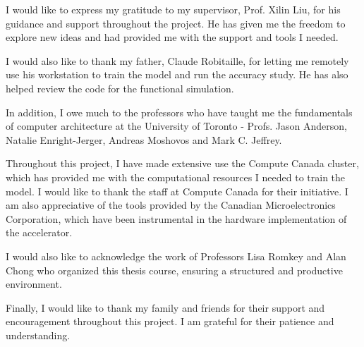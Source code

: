 I would like to express my gratitude to my supervisor, Prof. Xilin Liu, for his guidance and support throughout the project. He has given me the freedom to explore new ideas and had provided me with the
support and tools I needed.

I would also like to thank my father, Claude Robitaille, for letting me remotely use his workstation to train the model and run the accuracy study. He has also helped review the code for the functional simulation.

In addition, I owe much to the professors who have taught me the fundamentals of computer architecture at the University of Toronto - Profs. Jason Anderson, Natalie Enright-Jerger, Andreas Moshovos and Mark C. Jeffrey.

Throughout this project, I have made extensive use the Compute Canada cluster, which has provided me with the computational resources I needed to train the model. I would like to thank the 
staff at Compute Canada for their initiative. I am also appreciative of the tools provided by the Canadian Microelectronics Corporation, which have been instrumental in the hardware implementation of the accelerator.

I would also like to acknowledge the work of Professors Lisa Romkey and Alan Chong who organized this thesis course, ensuring a structured and productive environment.

Finally, I would like to thank my family and friends for their support and encouragement throughout this project. I am grateful for their patience and understanding.
